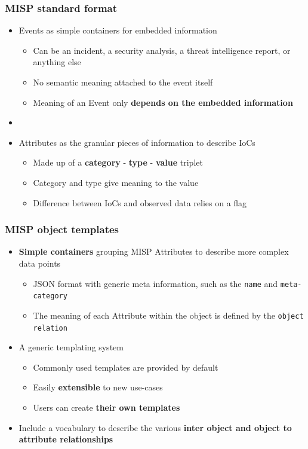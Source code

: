 \begin{frame}
    \frametitle{MISP standard format}
    \begin{itemize}
        \item Events as simple containers for embedded information
        \begin{itemize}
            \item Can be an incident, a security analysis, a threat intelligence report, or anything else
            \item No semantic meaning attached to the event itself
            \item Meaning of an Event only \textbf{depends on the embedded information}
        \end{itemize}
        \item []
        \item Attributes as the granular pieces of information to describe IoCs
        \begin{itemize}
            \item Made up of a \textbf{category} - \textbf{type} - \textbf{value} triplet
            \item Category and type give meaning to the value
            \item Difference between IoCs and observed data relies on a flag
        \end{itemize}
    \end{itemize}
\end{frame}

\begin{frame}
    \frametitle{MISP object templates}
    \begin{itemize}
        \item \textbf{Simple containers} grouping MISP Attributes to describe more complex data points
        \begin{itemize}
            \item JSON format with generic meta information, such as the \texttt{name} and \texttt{meta-category}
            \item The meaning of each Attribute within the object is defined by the \texttt{object relation}
        \end{itemize}
        \item A generic templating system
        \begin{itemize}
            \item Commonly used templates are provided by default
            \item Easily \textbf{extensible} to new use-cases
            \item Users can create \textbf{their own templates}
        \end{itemize}
        \item Include a vocabulary to describe the various \textbf{inter object and object to attribute relationships}
    \end{itemize}
\end{frame}

